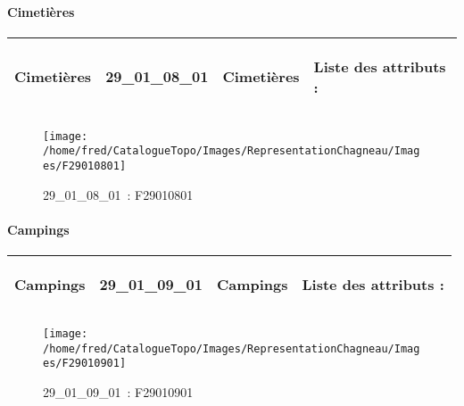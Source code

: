 \documentclass[12pt,titlepage,oneside]{book}
\begin{document}
\paragraph{Cimetières}
\noindent
\vspace{\baselineskip}

\renewcommand{\arraystretch}{1.2}
\begin{supertabular}{|p{10cm}|c|p{13cm}|p{12cm}|}
 Cimetières & 29\_01\_08\_01 & Cimetières & Liste des attributs :
\begin{enumerate}
\end{enumerate}
\\
\hline
\end{supertabular}
\begin{figure}[h!]
  \hfill         %
  \begin{minipage}[t]{3cm}
    \begin{center}
      \texttt{[image: /home/fred/CatalogueTopo/Images/RepresentationChagneau/Images/F29010801]}
      \caption[~29\_01\_08\_01]{\small{29\_01\_08\_01~:} \tiny{F29010801}}\label{F29010801}
    \end{center}
  \end{minipage}
\end{figure}


\paragraph{Campings}
\noindent
\vspace{\baselineskip}

\renewcommand{\arraystretch}{1.2}
\begin{supertabular}{|p{10cm}|c|p{13cm}|p{12cm}|}
 Campings & 29\_01\_09\_01 & Campings & Liste des attributs :
\begin{enumerate}
\end{enumerate}
\\
\hline
\end{supertabular}
\begin{figure}[h!]
  \hfill         %
  \begin{minipage}[t]{3cm}
    \begin{center}
      \texttt{[image: /home/fred/CatalogueTopo/Images/RepresentationChagneau/Images/F29010901]}
      \caption[~29\_01\_09\_01]{\small{29\_01\_09\_01~:} \tiny{F29010901}}\label{F29010901}
    \end{center}
  \end{minipage}
\end{figure}
\end{document}
